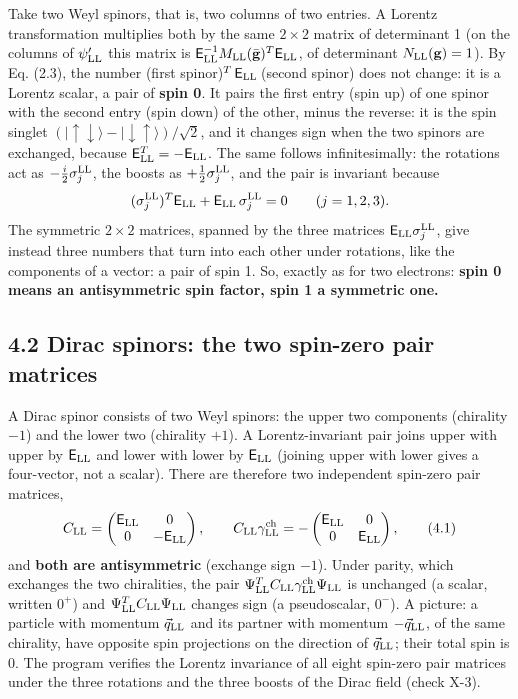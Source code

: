 \documentclass[
  10pt,
]{article}
\begin{document}
Take two Weyl spinors, that is, two columns of two entries. A Lorentz
transformation multiplies both by the same \(2\times2\) matrix of
determinant 1 (on the columns of \(\psi'_{\rm LL}\) this matrix is
\(\mathsf E_{\rm LL}^{-1}M_{\rm LL}(\bar{\mathbf g})^T\mathsf E_{\rm LL}\),
of determinant \(N_{\rm LL}(\mathbf g)=1\)). By Eq. (2.3), the number
(first spinor)\(^T\,\mathsf E_{\rm LL}\,\)(second spinor) does not
change: it is a Lorentz scalar, a pair of \textbf{spin 0}. It pairs the
first entry (spin up) of one spinor with the second entry (spin down) of
the other, minus the reverse: it is the spin singlet
\((\lvert\uparrow\downarrow\rangle-\lvert\downarrow\uparrow\rangle)/\sqrt2\),
and it changes sign when the two spinors are exchanged, because
\(\mathsf E_{\rm LL}^T=-\mathsf E_{\rm LL}\). The same follows
infinitesimally: the rotations act as \(-\tfrac i2\sigma^{\rm LL}_j\),
the boosts as \(+\tfrac12\sigma^{\rm LL}_j\), and the pair is invariant
because
\[(\sigma^{\rm LL}_j)^T\mathsf E_{\rm LL}+\mathsf E_{\rm LL}\,\sigma^{\rm LL}_j=0\qquad(j=1,2,3).\]
The symmetric \(2\times2\) matrices, spanned by the three matrices
\(\mathsf E_{\rm LL}\sigma^{\rm LL}_j\), give instead three numbers that
turn into each other under rotations, like the components of a vector: a
pair of spin 1. So, exactly as for two electrons: \textbf{spin 0 means
an antisymmetric spin factor, spin 1 a symmetric one.}

\hypertarget{dirac-spinors-the-two-spin-zero-pair-matrices}{%
\subsection{4.2 Dirac spinors: the two spin-zero pair
matrices}\label{dirac-spinors-the-two-spin-zero-pair-matrices}}

A Dirac spinor consists of two Weyl spinors: the upper two components
(chirality \(-1\)) and the lower two (chirality \(+1\)). A
Lorentz-invariant pair joins upper with upper by \(\mathsf E_{\rm LL}\)
and lower with lower by \(\mathsf E_{\rm LL}\) (joining upper with lower
gives a four-vector, not a scalar). There are therefore two independent
spin-zero pair matrices,
\[C_{\rm LL}=\begin{pmatrix}\mathsf E_{\rm LL}&0\\0&-\mathsf E_{\rm LL}\end{pmatrix},\qquad C_{\rm LL}\gamma^{\rm ch}_{\rm LL}=-\begin{pmatrix}\mathsf E_{\rm LL}&0\\0&\mathsf E_{\rm LL}\end{pmatrix}, \tag{4.1}\]
and \textbf{both are antisymmetric} (exchange sign \(-1\)). Under
parity, which exchanges the two chiralities, the pair
\(\Psi^T_{\rm LL}C_{\rm LL}\gamma^{\rm ch}_{\rm LL}\Psi_{\rm LL}\) is
unchanged (a scalar, written \(0^+\)) and
\(\Psi^T_{\rm LL}C_{\rm LL}\Psi_{\rm LL}\) changes sign (a pseudoscalar,
\(0^-\)). A picture: a particle with momentum \(\vec q_{\rm LL}\) and
its partner with momentum \(-\vec q_{\rm LL}\), of the same chirality,
have opposite spin projections on the direction of \(\vec q_{\rm LL}\);
their total spin is 0. The program verifies the Lorentz invariance of
all eight spin-zero pair matrices under the three rotations and the
three boosts of the Dirac field (check X-3).
\end{document}
